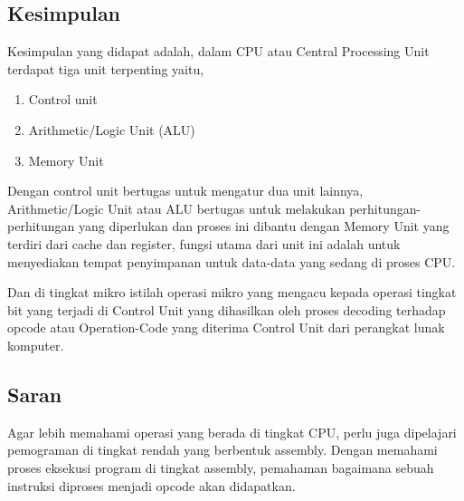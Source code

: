 \subsection{Kesimpulan}

Kesimpulan yang didapat adalah, dalam CPU atau Central Processing Unit terdapat
tiga unit terpenting yaitu,

\begin{enumerate}[label=\alph*.]
  \item Control unit
  \item Arithmetic/Logic Unit (ALU)
  \item Memory Unit
\end{enumerate}

Dengan control unit bertugas untuk mengatur dua unit lainnya, Arithmetic/Logic Unit
atau ALU bertugas untuk melakukan perhitungan-perhitungan yang diperlukan dan proses
ini dibantu dengan Memory Unit yang terdiri dari cache dan register, fungsi utama dari
unit ini adalah untuk menyediakan tempat penyimpanan untuk data-data yang sedang di proses CPU.

Dan di tingkat mikro istilah operasi mikro yang mengacu kepada operasi tingkat
bit yang terjadi di Control Unit yang dihasilkan oleh proses decoding terhadap opcode atau
Operation-Code yang diterima Control Unit dari perangkat lunak komputer.

\subsection{Saran}

Agar lebih memahami operasi yang berada di tingkat CPU, perlu juga dipelajari
pemograman di tingkat rendah yang berbentuk assembly. Dengan memahami proses
eksekusi program di tingkat assembly, pemahaman bagaimana sebuah instruksi diproses
menjadi opcode akan didapatkan.
